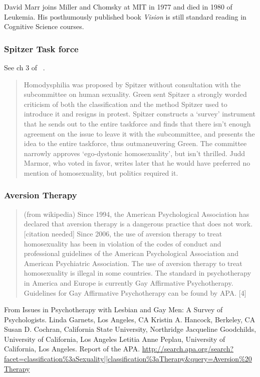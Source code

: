 \begin{refsection}
David Marr joins Miller and Chomsky at MIT in 1977 and died in 1980 of Leukemia. His posthumously published book \emph{Vision} is still standard reading in Cognitive Science courses.

\subsubsection{Spitzer Task force}
\label{spitzertaskforce}

See ch 3 of ~\citep{Kutchins:9eEZL39p}. 

\begin{quote}

Homodysphilia was proposed by Spitzer without consultation with the subcommittee on human sexuality. Green sent Spitzer a strongly worded criticism of both the classification and the method Spitzer used to introduce it and resigns in protest. Spitzer constructs a `survey' instrument that he sends out to the entire taskforce and finds that there isn't enough agreement on the issue to leave it with the subcommittee, and presents the idea to the entire taskforce, thus outmaneuvering Green. The committee narrowly approves `ego-dystonic homosexuality', but isn't thrilled. Judd Marmor, who voted in favor, writes later that he would have preferred no mention of homosexuality, but politics required it.
\end{quote}

\subsubsection{Aversion Therapy}
\label{aversiontherapy}

\begin{quote}

(from wikipedia) Since 1994, the American Psychological Association has declared that aversion therapy is a dangerous practice that does not work.[citation needed] Since 2006, the use of aversion therapy to treat homosexuality has been in violation of the codes of conduct and professional guidelines of the American Psychological Association and American Psychiatric Association. The use of aversion therapy to treat homosexuality is illegal in some countries. The standard in psychotherapy in America and Europe is currently Gay Affirmative Psychotherapy. Guidelines for Gay Affirmative Psychotherapy can be found by APA. [4]
\end{quote}

From Issues in Psychotherapy with Lesbian and Gay Men: A Survey of Psychologists. Linda Garnets, Los Angeles, CA Kristin A. Hancock, Berkeley, CA Susan D. Cochran, California State University, Northridge Jacqueline Goodchilds, University of California, Los Angeles Letitia Anne Peplau, University of California, Los Angeles. Report of the APA. \url{http://search.apa.org/search?facet=classification%3aSexuality||classification%3aTherapy&query=Aversion%20Therapy}


\end{refsection}

